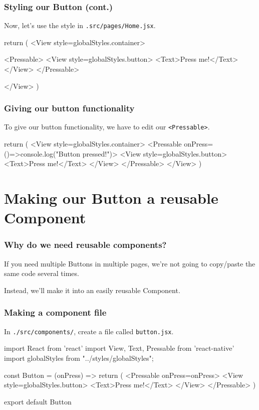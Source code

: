 \documentclass{beamer}
\begin{document}
  \begin{frame}[fragile]
    \frametitle{Styling our Button (cont.)}
    Now, let's use the style in \verb|.src/pages/Home.jsx|.

    \vspace{0.5cm}
    \begin{jscodesmall}
return (
  <View style={globalStyles.container}>

    <Pressable>
        <View style={globalStyles.button}>
          <Text>Press me!</Text>
        </View>
    </Pressable>

  </View>
)
    \end{jscodesmall}
  \end{frame}

  \begin{frame}[fragile]
    \frametitle{Giving our button functionality}
    To give our button functionality, we have to edit our \verb|<Pressable>|. 

    \vspace{0.5cm}
    \begin{jscodesmall}
return (
  <View style={globalStyles.container}>
    <Pressable onPress={()=>{console.log("Button pressed!")}}>
      <View style={globalStyles.button}>
        <Text>Press me!</Text>
      </View>
    </Pressable>
  </View>
)
    \end{jscodesmall}
  \end{frame}

  \section{Making our Button a reusable Component}
  \begin{frame}[fragile]
    \frametitle{Why do we need reusable components?}
    
    If you need multiple Buttons in multiple pages, we're not going to copy/paste the same code several times.
    
    Instead, we'll make it into an easily reusable Component. 
  \end{frame}

  \begin{frame}[fragile]
    \frametitle{Making a component file}
    In \verb|./src/components/|, create a file called \verb|button.jsx|. 

    \vspace{0.5cm}
    \begin{jscodesmall}
import React from 'react'
import {View, Text, Pressable} from 'react-native'
import globalStyles from "../styles/globalStyles";

const Button = ({onPress}) => {
  return (
    <Pressable onPress={onPress}>
      <View style={globalStyles.button}>
        <Text>Press me!</Text>
      </View>
    </Pressable>
  )
}

export default Button
    \end{jscodesmall}
  \end{frame}
\end{document}
